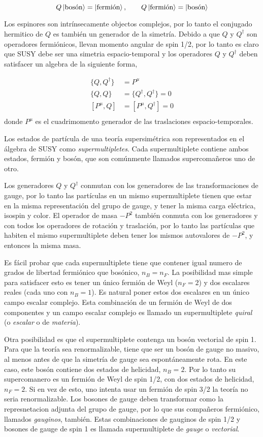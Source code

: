 \begin{equation}
  Q \left| \text{bosón} \right> = \left| \text{fermión} \right>, \quad \quad Q \left| \text{fermión} \right> = \left| \text{bosón} \right>
\end{equation}

Los espinores son intrínsecamente objectos complejos, por lo tanto el conjugado
hermitico de $Q$ es también un generador de la simetría. Debido a que $Q$ y $Q^\dagger$
son operadores fermiónicos, llevan momento angular de spin 1/2, por lo tanto es
claro que SUSY debe ser una simetria espacio-temporal y los operadores $Q$ y
$Q^\dagger$ deben satisfacer un algebra de la siguiente forma,

\begin{align}
  \{Q, Q^\dagger\} &= P^\mu \\
  \{Q, Q\} &= \{Q^\dagger, Q^\dagger\} = 0 \\
  [P^\mu, Q] &= [P^\mu, Q^\dagger] = 0 \\
\end{align}
%
donde $P^\mu$ es el cuadrimomento generador de las traslaciones espacio-temporales.

Los estados de partícula de una teoría supersimétrica son representados en
el álgebra de SUSY como \emph{supermultipletes}. Cada supermultiplete contiene
ambos estados, fermión y bosón, que son comúnmente llamados supercoma\~neros
uno de otro.

Los generadores $Q$ y $Q^\dagger$ conmutan con los generadores de las
transformaciones de gauge, por lo tanto las partículas en un mismo supermultiplete
tienen que estar en la misma representación del grupo de gauge, y tener la misma
carga eléctrica, isospin y color. El operador de masa $-P^2$ también conmuta con los
generadores y con todos los operadores de rotación y traslación, por lo tanto las
partículas que habiten el mismo supermultiplete deben tener los mismos autovalores
de $-P^2$, y entonces la misma masa.

Es fácil probar que cada supermultiplete tiene que contener igual numero de grados
de libertad fermiónico que bosónico, $n_B = n_F$.
La posibilidad mas simple para satisfacer esto es tener un único fermión de Weyl
($n_F=2$) y dos escalares reales (cada uno con $n_B=1$). Es natural poner estos
dos escalares en un único campo escalar complejo. Esta combinación de un fermión
de Weyl de dos componentes y un campo escalar complejo es llamado un supermultiplete
\emph{quiral} (o \emph{escalar} o de \emph{materia}).


Otra posibilidad es
que el supermultiplete contenga un bosón vectorial de spin 1. Para que la teoría
sea renormalizable, tiene que ser un bosón de gauge no masivo, al menos antes de
que la simetría de gauge sea espontáneamente rota. En este caso, este bosón contiene
dos estados de helicidad, $n_B=2$. Por lo tanto su supercomanero es un fermión de Weyl
de spin 1/2, con dos estados de helicidad, $n_F=2$. Si en vez de esto, uno intenta usar
un fermión de spin 3/2 la teoría no seria renormalizable. Los bosones de gauge deben
transformar como la represnetacion adjunta del grupo de gauge, por lo que sus compañeros
fermiónico, llamados \emph{gauginos}, también. Estas combinaciones de gauginos de
spin 1/2 y bosones de gauge de spin 1 es llamada supermultiplete de \emph{gauge} o
\emph{vectorial}.

